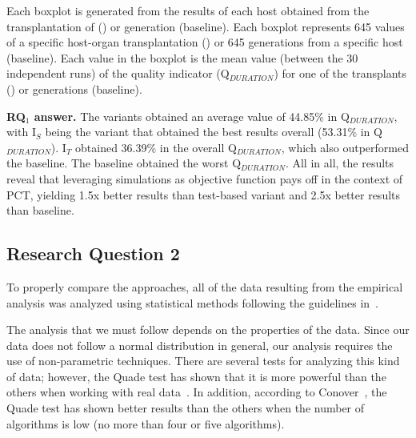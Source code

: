 Each boxplot is generated from the results of each host obtained from the transplantation of (\ApproachName{}) or generation (baseline). Each boxplot represents 645 values of a specific host-organ transplantation (\ApproachName{}) or 645 generations from a specific host (baseline). Each value in the boxplot is the mean value (between the 30 independent runs) of the quality indicator (Q$_{DURATION}$) for one of the transplants (\ApproachName{}) or generations (baseline).


\textbf{RQ$_1$ answer. }
The variants obtained an average value of 44.85\% in Q$_{DURATION}$, with I$_S$ being the variant that obtained the best results overall (53.31\% in Q$_{DURATION}$). I$_T$ obtained 36.39\% in the overall Q$_{DURATION}$, which also outperformed the baseline. The baseline obtained the worst Q$_{DURATION}$. All in all, the results reveal that leveraging simulations as objective function pays off in the context of PCT, yielding 1.5x better results than test-based variant and 2.5x better results than baseline.

\subsection{Research Question 2}

To properly compare the approaches, all of the data resulting from the empirical analysis was analyzed using statistical methods following the guidelines in~\cite{Arcuri2014}.

The analysis that we must follow depends on the properties of the data. Since our data does not follow a normal distribution in general, our analysis requires the use of non-parametric techniques. There are several tests for analyzing this kind of data; however, the Quade test has shown that it is more powerful than the others when working with real data~\cite{Garcia2010}. In addition, according to Conover~\cite{Conover1999}, the Quade test has shown better results than the others when the number of algorithms is low (no more than four or five algorithms).


